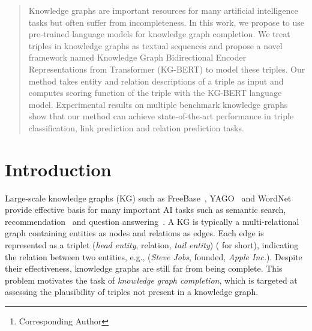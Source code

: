\documentclass[letterpaper]{article} \usepackage{aaai20}  \usepackage{times}  \usepackage{helvet} \usepackage{courier}  \usepackage[hyphens]{url}  \usepackage{graphicx} \urlstyle{rm} \def\UrlFont{\rm}  \usepackage{graphicx}  \usepackage{amsmath}
\author{Liang Yao, Chengsheng Mao, Yuan Luo\thanks{Corresponding Author}\\
Northwestern University\\
Chicago IL 60611\\
\{liang.yao, chengsheng.mao, yuan.luo\}@northwestern.edu\\
}
\begin{document}
\maketitle

\begin{abstract}
Knowledge graphs are important resources for many artificial intelligence tasks but often suffer from incompleteness. In this work, we propose to use pre-trained language models for knowledge graph completion. We treat triples in knowledge graphs as textual sequences and propose a novel framework named Knowledge Graph Bidirectional Encoder Representations from Transformer (KG-BERT) to model these triples. Our method takes entity and relation descriptions of a triple as input and computes scoring function of the triple with the KG-BERT language model. Experimental results on multiple benchmark knowledge graphs show that our method can achieve state-of-the-art performance in triple classification, link prediction and relation prediction tasks.
\end{abstract}

\section{Introduction}
\noindent Large-scale knowledge graphs (KG) such as FreeBase~\cite{bollacker2008freebase}, YAGO~\cite{suchanek2007yago} and WordNet~\cite{miller1995wordnet} provide effective basis for many important AI tasks such as semantic search, recommendation~\cite{zhang2016collaborative} and question answering~\cite{cui2017kbqa}. A KG is typically a multi-relational graph containing entities as nodes and relations as edges. Each edge is represented as a triplet (\textit{head entity}, relation, \textit{tail entity}) ( for short), indicating the relation between two entities, e.g., (\textit{Steve Jobs}, founded, \textit{Apple Inc.}). Despite their effectiveness, knowledge graphs are still far from being complete. This problem motivates the task of \textit{knowledge graph completion}, which is targeted at assessing the plausibility of triples not present in a knowledge graph.
\end{document}
